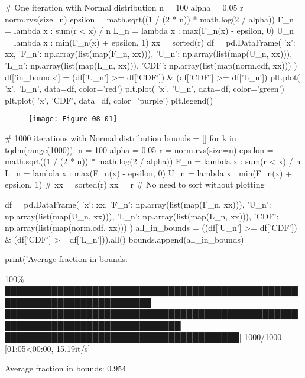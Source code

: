 \begin{python}
# One iteration wtih Normal distribution
n = 100
alpha = 0.05
r = norm.rvs(size=n)
epsilon = math.sqrt((1 / (2 * n)) * math.log(2 / alpha))
F_n = lambda x : sum(r < x) / n
L_n = lambda x : max(F_n(x) - epsilon, 0)
U_n = lambda x : min(F_n(x) + epsilon, 1)
xx = sorted(r)
df = pd.DataFrame({
    'x': xx, 
    'F_n': np.array(list(map(F_n, xx))), 
    'U_n': np.array(list(map(U_n, xx))), 
    'L_n': np.array(list(map(L_n, xx))), 
    'CDF': np.array(list(map(norm.cdf, xx)))
})
df['in_bounds'] = (df['U_n'] >= df['CDF']) & (df['CDF'] >= df['L_n'])
plt.plot( 'x', 'L_n', data=df, color='red')
plt.plot( 'x', 'U_n', data=df, color='green')
plt.plot( 'x', 'CDF', data=df, color='purple')
plt.legend()
\end{python}

\begin{figure}[H]
\centering
\texttt{[image: Figure-08-01]}
\end{figure}

    

\begin{python}
# 1000 iterations with Normal distribution
bounds = []
for k in tqdm(range(1000)):
    n = 100
    alpha = 0.05
    r = norm.rvs(size=n)
    epsilon = math.sqrt((1 / (2 * n)) * math.log(2 / alpha))
    F_n = lambda x : sum(r < x) / n
    L_n = lambda x : max(F_n(x) - epsilon, 0)
    U_n = lambda x : min(F_n(x) + epsilon, 1)
    # xx = sorted(r)
    xx = r # No need to sort without plotting
    
    df = pd.DataFrame({
        'x': xx, 
        'F_n': np.array(list(map(F_n, xx))), 
        'U_n': np.array(list(map(U_n, xx))), 
        'L_n': np.array(list(map(L_n, xx))), 
        'CDF': np.array(list(map(norm.cdf, xx)))
    })
    all_in_bounds = ((df['U_n'] >= df['CDF']) & (df['CDF'] >= df['L_n'])).all()
    bounds.append(all_in_bounds)
    
print('Average fraction in bounds: %
\end{python}
\begin{console}
100\%|███████████████████████████████████████████████████████████████████████████
████████████████████████████████████████████████████████████████████████████████
████████████████████████████████████████| 1000/1000 [01:05<00:00, 15.19it/s]
\end{console}
\begin{console}
Average fraction in bounds: 0.954
\end{console}

